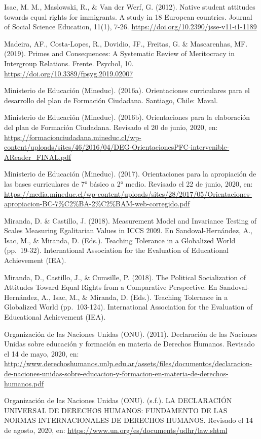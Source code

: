 \documentclass[12pt,twoside]{templates/facsothesis}
\begin{document}
Isac, M. M., Maslowski, R., \& Van der Werf, G. (2012). Native student attitudes towards equal rights for immigrants. A study in 18 European countries. Journal of Social Science Education, 11(1), 7-26. \url{https://doi.org/10.2390/jsse-v11-i1-1189}

Madeira, AF., Costa-Lopes, R., Dovidio, JF., Freitas, G. \& Mascarenhas, MF. (2019). Primes and Consequences: A Systematic Review of Meritocracy in Intergroup Relations. Frente. Psychol, 10. \url{https://doi.org/10.3389/fpsyg.2019.02007}

Ministerio de Educación (Mineduc). (2016a). Orientaciones curriculares para el desarrollo del plan de Formación Ciudadana. Santiago, Chile: Maval.

Ministerio de Educación (Mineduc). (2016b). Orientaciones para la elaboración del plan de Formación Ciudadana. Revisado el 20 de junio, 2020, en: \url{https://formacionciudadana.mineduc.cl/wp-content/uploads/sites/46/2016/04/DEG-OrientacionesPFC-intervenible-AReader_FINAL.pdf}

Ministerio de Educación (Mineduc). (2017). Orientaciones para la apropiación de las bases curriculares de 7° básico a 2° medio. Revisado el 22 de junio, 2020, en: \url{https://media.mineduc.cl/wp-content/uploads/sites/28/2017/05/Orientaciones-apropiacion-BC-7\%C2\%BA-2\%C2\%BAM-web-corregido.pdf}

Miranda, D. \& Castillo, J. (2018). Measurement Model and Invariance Testing of Scales Measuring Egalitarian Values in ICCS 2009. En Sandoval-Hernández, A., Isac, M., \& Miranda, D. (Eds.). Teaching Tolerance in a Globalized World (pp.~19-32). International Association for the Evaluation of Educational Achievement (IEA).

Miranda, D., Castillo, J., \& Cumsille, P. (2018). The Political Socialization of Attitudes Toward Equal Rights from a Comparative Perspective. En Sandoval-Hernández, A., Isac, M., \& Miranda, D. (Eds.). Teaching Tolerance in a Globalized World (pp.~103-124). International Association for the Evaluation of Educational Achievement (IEA).

Organización de las Naciones Unidas (ONU). (2011). Declaración de las Naciones Unidas sobre educación y formación en materia de Derechos Humanos. Revisado el 14 de mayo, 2020, en: \url{http://www.derechoshumanos.unlp.edu.ar/assets/files/documentos/declaracion-de-naciones-unidas-sobre-educacion-y-formacion-en-materia-de-derechos-humanos.pdf}

Organización de las Naciones Unidas (ONU). (s.f.). LA DECLARACIÓN UNIVERSAL DE DERECHOS HUMANOS: FUNDAMENTO DE LAS NORMAS INTERNACIONALES DE DERECHOS HUMANOS. Revisado el 14 de agosto, 2020, en: \url{https://www.un.org/es/documents/udhr/law.shtml}
\end{document}

